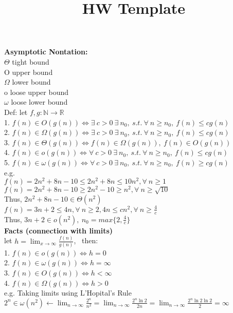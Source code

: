 \documentclass[20pt,letterpaper]{article}
\title{HW Template}
\begin{document}
{\bf Asymptotic Nontation:} \\
$\Theta$  tight bound \\
O  upper bound \\
$\Omega$ lower bound \\
o loose upper bound \\
$\omega$ loose lower bound \\

Def: let $f, g: \mathbb{N} \rightarrow \mathbb{R}$ \\
1. $f(n) \in O(g(n)) \iff \exists\ c > 0 \ \exists\ n_0, \ s.t.\ \forall\ n \geq n_0, \ f(n) \leq cg(n) $ \\
2. $f(n) \in \Omega(g(n)) \iff \exists\ c > 0 \ \exists\ n_0, \ s.t.\ \forall\ n \geq n_0, \ f(n) \leq cg(n) $ \\
3. $f(n) \in \Theta(g(n)) \iff f(n) \in \Omega(g(n)), \ f(n) \in O(g(n)) $ \\
4. $f(n) \in o(g(n)) \iff \forall\ c > 0 \ \exists\ n_0, \ s.t.\ \forall\ n \geq n_0, \ f(n) \leq cg(n) $ \\
5. $f(n) \in \omega(g(n)) \iff \forall\ c > 0 \ \exists\ n_0, \ s.t.\ \forall\ n \geq n_0, \ f(n) \geq cg(n) $ \\

e.g. \\
$f(n)=2n^2+8n-10 \leq 2n^2+8n \leq 10n^2, \forall\ n \geq 1 $ \\
$f(n)=2n^2+8n-10 \geq 2n^2-10 \geq n^2, \forall\ n \geq \sqrt{10} $ \\
Thus, $2n^2+8n-10 \in \Theta(n^2) $ \\
$f(n)=3n+2 \leq 4n, \forall\ n \geq 2, 4n \leq cn^2, \forall\ n \geq \frac{4}{c} $ \\
Thus, $3n+2 \in o(n^2), \ n_0 = max\{2, \frac{4}{c}\} $ \\

{\bf Facts (connection with limits)} \\
let $h = \lim_{x \to \infty} \frac{f(n)}{g(n)}$, \ then: \\
1. $f(n) \in o(g(n)) \iff h = 0 $ \\
2. $f(n) \in \omega(g(n)) \iff h = \infty $ \\
3. $f(n) \in O(g(n)) \iff h < \infty $ \\
4. $f(n) \in \Omega(g(n)) \iff h > 0 $ \\

e.g. Taking limits using L'Hopital's Rule \\
$2^n \in \omega(n^2) \leftarrow \lim_{n \to \infty} \frac{2^n}{n^2} = \lim_{n \to \infty} \frac{2^n\ln2}{2n} =  \lim_{n \to \infty} \frac{2^n\ln2\ln2}{2} = \infty $ \\
\end{document}
